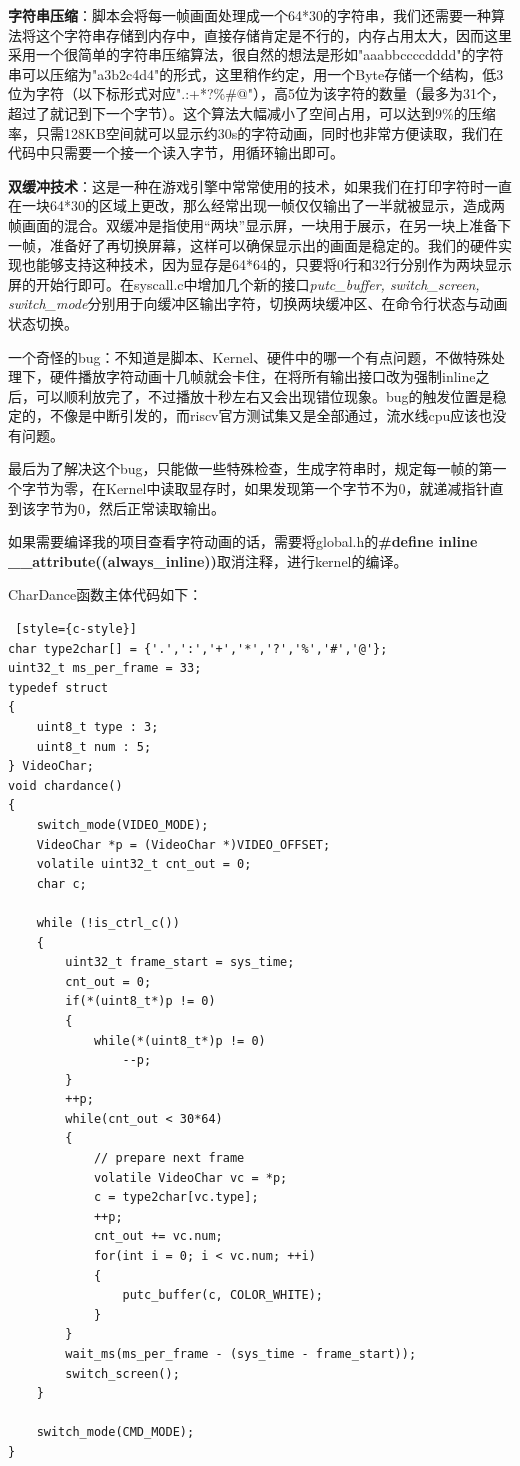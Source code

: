\documentclass[]{article}
\begin{document}
  \textbf{字符串压缩}：脚本会将每一帧画面处理成一个64*30的字符串，我们还需要一种算法将这个字符串存储到内存中，直接存储肯定是不行的，内存占用太大，因而这里采用一个很简单的字符串压缩算法，很自然的想法是形如"aaabbccccdddd"的字符串可以压缩为"a3b2c4d4"的形式，这里稍作约定，用一个Byte存储一个结构，低3位为字符（以下标形式对应".:+*?\%\#@"），高5位为该字符的数量（最多为31个，超过了就记到下一个字节）。这个算法大幅减小了空间占用，可以达到9\%的压缩率，只需128KB空间就可以显示约30s的字符动画，同时也非常方便读取，我们在代码中只需要一个接一个读入字节，用循环输出即可。

  \textbf{双缓冲技术}：这是一种在游戏引擎中常常使用的技术，如果我们在打印字符时一直在一块64*30的区域上更改，那么经常出现一帧仅仅输出了一半就被显示，造成两帧画面的混合。双缓冲是指使用“两块”显示屏，一块用于展示，在另一块上准备下一帧，准备好了再切换屏幕，这样可以确保显示出的画面是稳定的。我们的硬件实现也能够支持这种技术，因为显存是64*64的，只要将0行和32行分别作为两块显示屏的开始行即可。在syscall.c中增加几个新的接口\textit{putc\_buffer, switch\_screen, switch\_mode}分别用于向缓冲区输出字符，切换两块缓冲区、在命令行状态与动画状态切换。

  一个奇怪的bug：不知道是脚本、Kernel、硬件中的哪一个有点问题，不做特殊处理下，硬件播放字符动画十几帧就会卡住，在将所有输出接口改为强制inline之后，可以顺利放完了，不过播放十秒左右又会出现错位现象。bug的触发位置是稳定的，不像是中断引发的，而riscv官方测试集又是全部通过，流水线cpu应该也没有问题。
  
  最后为了解决这个bug，只能做一些特殊检查，生成字符串时，规定每一帧的第一个字节为零，在Kernel中读取显存时，如果发现第一个字节不为0，就递减指针直到该字节为0，然后正常读取输出。
  
  如果需要编译我的项目查看字符动画的话，需要将global.h的\textbf{\#define inline \_\_attribute((always\_inline))}取消注释，进行kernel的编译。

  CharDance函数主体代码如下：
  \begin{lstlisting} [style={c-style}]
char type2char[] = {'.',':','+','*','?','%','#','@'};
uint32_t ms_per_frame = 33;
typedef struct
{
    uint8_t type : 3;
    uint8_t num : 5;
} VideoChar;
void chardance()
{
    switch_mode(VIDEO_MODE);
    VideoChar *p = (VideoChar *)VIDEO_OFFSET;
    volatile uint32_t cnt_out = 0;
    char c;

    while (!is_ctrl_c())
    {
        uint32_t frame_start = sys_time;
        cnt_out = 0;
        if(*(uint8_t*)p != 0)
        {
            while(*(uint8_t*)p != 0)
                --p;
        }
        ++p;
        while(cnt_out < 30*64)
        {
            // prepare next frame
            volatile VideoChar vc = *p;
            c = type2char[vc.type];
            ++p;
            cnt_out += vc.num;
            for(int i = 0; i < vc.num; ++i)
            {
                putc_buffer(c, COLOR_WHITE);
            }
        }
        wait_ms(ms_per_frame - (sys_time - frame_start));
        switch_screen();
    }

    switch_mode(CMD_MODE);
}
      \end{lstlisting}  
\end{document}
